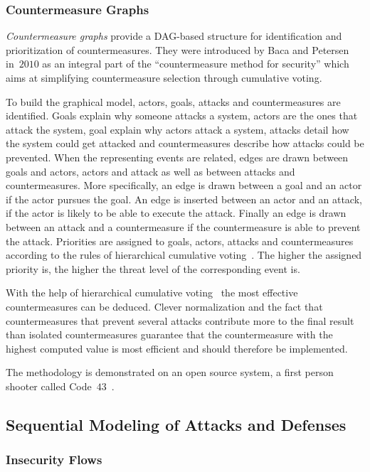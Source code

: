 \documentclass[a4paper]{article}
\begin{document}
\subsubsection{Countermeasure Graphs} 
\label{sec:countermeausre_graphs}

\emph{Countermeasure graphs} provide a DAG-based structure for identification
and prioritization of countermeasures. They were introduced by Baca and
Petersen~\cite{BaPe} in~$2010$ as an integral part of the ``countermeasure
method for security'' which aims at simplifying countermeasure selection through
cumulative voting.

To build the graphical model, actors, goals, attacks and countermeasures are
identified. Goals explain why someone attacks a system, actors are the ones 
that attack the system, goal explain why actors attack a system, attacks detail 
how the system could get attacked and countermeasures describe how attacks 
could be prevented. When the representing events are related, edges are drawn 
between goals and actors, actors and attack as well as between attacks and 
countermeasures. More specifically, an edge is drawn between a goal and an 
actor if the actor pursues the goal. An edge is inserted between an actor
and an attack, if the actor is likely to be able to execute the attack. Finally 
an edge is drawn between an attack and a countermeasure if the countermeasure 
is able to prevent the attack. Priorities are assigned to goals, actors, 
attacks and countermeasures according to the rules of hierarchical cumulative 
voting~\cite{BeSv}. The higher the assigned priority is, the higher the threat 
level of the corresponding event is.

With the help of hierarchical cumulative voting~\cite{BeSv} the most effective
countermeasures can be deduced. Clever normalization and the fact that
countermeasures that prevent several attacks contribute more to the final
result than isolated countermeasures guarantee that the countermeasure with
the highest computed value is most efficient and should therefore be
implemented.

The methodology is demonstrated on an open source system, a first person 
shooter called Code~$43$~\cite{BaPe}.

\subsection{Sequential Modeling of Attacks and Defenses}
\label{sec:both_sequential}

\subsubsection{Insecurity Flows} 
\label{sec:insecurity_flows}
\end{document}
